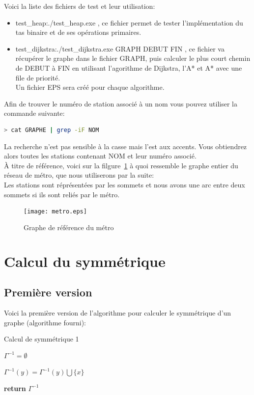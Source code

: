 \documentclass{article}
\begin{document}
Voici la liste des fichiers de test et leur utilisation:
\begin{itemize}
	\item test\_heap:./test\_heap.exe , ce fichier permet de tester l'implémentation du tas
		  binaire et de ses opérations primaires.
	\item test\_dijkstra:./test\_dijkstra.exe GRAPH DEBUT FIN , ce fichier va récupérer
		  le graphe dans le fichier GRAPH, puis calculer le plus court chemin de DEBUT à FIN
		  en utilisant l'agorithme de Dijkstra, l'A* et A* avec une file de priorité.\\
		  Un fichier EPS sera créé pour chaque algorithme.\\
\end{itemize}

Afin de trouver le numéro de station associé à un nom vous pouvez utiliser la commande suivante:
\begin{lstlisting}[language=bash]
	> cat GRAPHE | grep -iF NOM
\end{lstlisting}
La recherche n'est pas sensible à la casse mais l'est aux accents. Vous obtiendrez alors
toutes les stations contenant NOM et leur numéro associé.\\

À titre de référence, voici sur la filgure~\ref{metro} à quoi ressemble le graphe entier du réseau de métro, que nous
utiliserons par la suite:\\
Les stations sont réprésentées par les sommets et nous avons une arc entre deux sommets
si ils sont reliés par le métro.

\begin{figure}[!hbt]
	\centering
	\texttt{[image: metro.eps]}
	\caption{Graphe de référence du métro}
	\label{metro}
\end{figure}


\clearpage
\section{Calcul du symmétrique}
\subsection{Première version}

Voici la première version de l'algorithme pour calculer le symmétrique d'un graphe (algorithme fourni):

\begin{algorithm}
\caption{Calcul de symmétrique 1}\label{sym1}
\begin{algorithmic}[1]
	
		\State $\Gamma^{-1} = \emptyset$
	\EndFor
		
				\State $\Gamma^{-1}(y) = \Gamma^{-1}(y) \bigcup \{x\}$
			\EndIf
		\EndFor
	\EndFor
	
		\State \textbf{return} $\Gamma^{-1}$
\EndProcedure
\end{algorithmic}
\end{algorithm}
\end{document}
